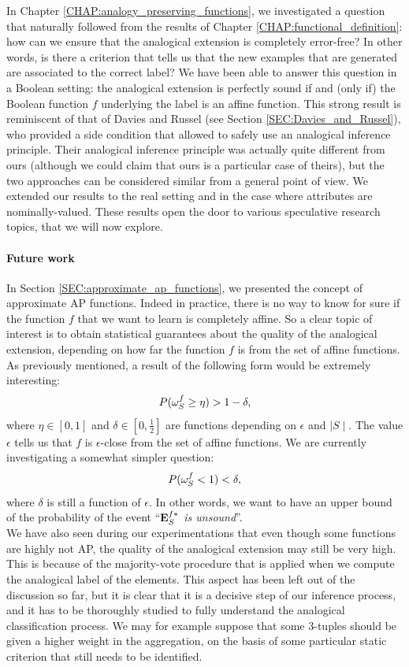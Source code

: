 In Chapter \ref{CHAP:analogy_preserving_functions}, we investigated a question
that naturally followed from the results of Chapter
\ref{CHAP:functional_definition}: how can we ensure that the analogical
extension is completely error-free? In other words, is there a criterion that
tells us that the new examples that are generated are associated to the correct
label? We have been able to answer this question in a Boolean setting: the
analogical extension is perfectly sound if and (only if) the Boolean function
$f$ underlying the label is an affine function. This strong result
\cite{CouHugPraRicIJCAI17} is reminiscent of that of Davies and Russel (see
Section \ref{SEC:Davies_and_Russel}), who provided a side condition that
allowed to safely use an analogical inference principle. Their analogical
inference principle was actually quite different from ours (although we could claim
that ours is a particular case of theirs), but the two approaches can be
considered similar from a general point of view. We extended our results to the
real setting and in the case where attributes are nominally-valued. These
results open the door to various speculative research topics, that we will now
explore.

\paragraph{Future work\\}

In Section \ref{SEC:approximate_ap_functions}, we presented the concept of
approximate AP functions. Indeed in practice, there is no way
to know for sure if the function $f$ that we want to learn is completely
affine. So a clear topic of interest is to obtain statistical guarantees about
the quality of the analogical extension, depending on how far the function $f$
is from the set of affine functions. As previously mentioned, a result of the
following form would be extremely interesting:
$$P(\omega_{S}^{f} \geq \eta) > 1 - \delta,$$
where $\eta \in [0, 1]$ and $\delta \in [0, \frac{1}{2}]$ are functions
depending on $\epsilon$ and $\mid S \mid$. The value $\epsilon$ tells us that
$f$ is $\epsilon$-close from the set of affine functions.  We are currently
investigating a somewhat simpler question:
$$P(\omega_{S}^{f} < 1) < \delta,$$
where $\delta$ is still a function of $\epsilon$. In other words, we want to
have an upper bound of the probability of the event ``\textit{$\mathbf{E}_{S}^{f*}$ is
unsound}''.\\

We have also seen during our experimentations that even though some functions are
highly not AP, the quality of the analogical extension may still be very high.
This is because of the majority-vote procedure that is applied when we compute
the analogical label of the elements. This aspect has been left out of the
discussion so far, but it is clear that it is a decisive step of our inference
process, and it has to be thoroughly studied to fully understand the analogical
classification process. We may for example suppose that some $3$-tuples should
be given a higher weight in the aggregation, on the basis of some particular
static criterion that still needs to be identified.\\

